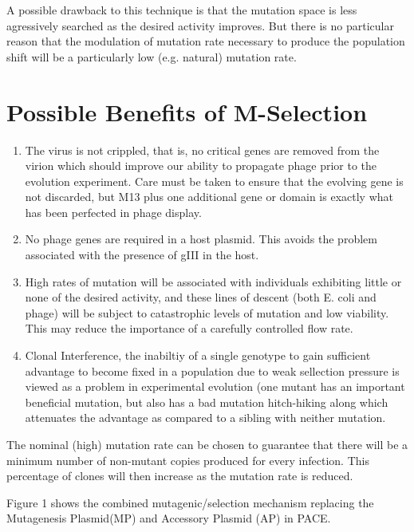 \documentclass[10pt,letterpaper]{article}
\begin{document}
A possible drawback to this technique is that the mutation space is less agressively searched as the desired activity improves.  But there is no particular reason that the modulation of mutation rate necessary to produce the population shift will be a particularly low (e.g. natural) mutation rate.

\section{Possible Benefits of M-Selection}
\begin{enumerate}
\item{The virus is not crippled, that is, no critical genes are removed from the virion which should improve our ability to propagate phage prior to the evolution experiment.  Care must be taken to ensure that the evolving gene is not discarded, but M13 plus one additional gene or domain is exactly what has been perfected in phage display.}
\item{No phage genes are required in a host plasmid.  This avoids the problem associated with the presence of gIII in the host.}
\item{High rates of mutation will be associated with individuals exhibiting little or none of the desired activity, and these lines of descent (both E. coli and phage) will be subject to catastrophic levels of mutation and low viability. This may reduce the importance of a carefully controlled flow rate.}
\item{Clonal Interference\cite{dynamics}, the inabiltiy of a single genotype to gain sufficient advantage to become fixed in a population due to weak sellection pressure is viewed as a problem in experimental evolution (one mutant has an important beneficial mutation, but also has a bad mutation hitch-hiking along which attenuates the advantage as compared to a sibling with neither mutation.}

\end{enumerate}

The nominal (high) mutation rate can be chosen to guarantee that there will be a minimum number of non-mutant copies produced for every infection.  This percentage of clones will then increase as the mutation rate is reduced.

Figure 1 shows the combined mutagenic/selection mechanism replacing the Mutagenesis Plasmid(MP) and Accessory Plasmid (AP) in PACE.

\def\boxone#1{
  \put(19,30){\line(1,0){67}}     %
  \put(19,0){\line(1,0){67}}      %
  \put(20,0){\line(0,1){30}}      %
  \put(85,0){\line(0,1){30}}      %
  \put(25,15){#1}
}
\def\boxtwo#1#2{
  \put(19,30){\line(1,0){80}}     %
  \put(19,0){\line(1,0){80}}      %
  \put(20,0){\line(0,1){30}}      %
  \put(98,0){\line(0,1){30}}      %
  \put(25,17){#1}
  \put(25,7){#2}
}
\def\circleone#1#2{\circle{#1}\put(-17,-4){#2}}
\def\circletwo#1#2#3{\circle{#1}\put(-17,0){#2}\put(-15,20){#3}}
\end{document}
